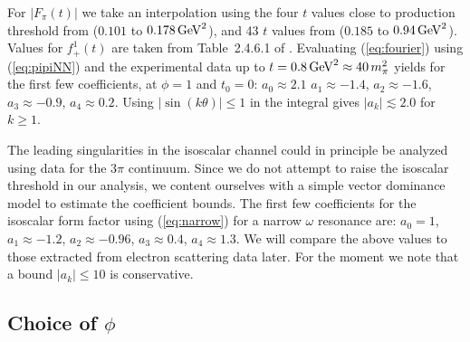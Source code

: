 \documentclass[12pt]{article}
\begin{document}
For $|F_\pi(t)|$ we take an interpolation using 
the four $t$ values close to production threshold from \cite{Amendolia:1983di} 
($0.101$ to $0.178\,{\rm GeV}^2$), and 43 $t$ values from \cite{Achasov:2005rg} 
($0.185$ to $0.94\,{\rm GeV}^2$).   
Values for $f_+^1(t)$ are taken from Table~2.4.6.1 of \cite{Hohler}.  
Evaluating (\ref{eq:fourier}) using (\ref{eq:pipiNN}) 
and the experimental data up to $t=0.8\,{\rm GeV}^2\approx 40\,m_\pi^2$
yields for the first few coefficients, 
at $\phi=1$ and $t_0=0$: 
$a_0 \approx 2.1$
$a_1 \approx -1.4$, $a_2 \approx -1.6$, $a_3\approx -0.9$, $a_4 \approx 0.2$.   
Using $|\sin(k\theta)|\le 1$ in the integral gives $|a_k| \lesssim 2.0$ for $k\ge 1$.    

The leading singularities in the isoscalar channel could in principle be analyzed using 
data for the $3\pi$ continuum.    Since we do not attempt to raise the isoscalar
threshold in our analysis, we content ourselves with a simple vector dominance model to estimate the 
coefficient bounds.  
The first few coefficients for the isoscalar 
form factor using (\ref{eq:narrow}) for a narrow $\omega$ resonance are: 
$a_0 =1$, $a_1 \approx -1.2$, $a_2\approx -0.96$, $a_3\approx 0.4$, $a_4 \approx 1.3$.  
We will compare the above values to those extracted from electron scattering data later. 
For the moment we note that a bound $|a_k|\le 10$ is conservative.  

\subsection{Choice of $\phi$} 
\end{document}
